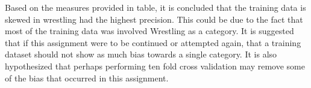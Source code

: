 \documentclass[12pt,letterpaper]{article}
\begin{document}
Based on the measures provided in table, it is concluded that the training data is skewed in wrestling had the highest precision. This could be due to the fact that most of the training data was involved Wrestling as a category. It is suggested that if this assignment were to be continued or attempted again, that a training dataset should not show as much bias towards a single category. It is also hypothesized that perhaps performing ten fold cross validation may remove some of the bias that occurred in this assignment. 
\newpage 
\printbibliography
\end{document}
